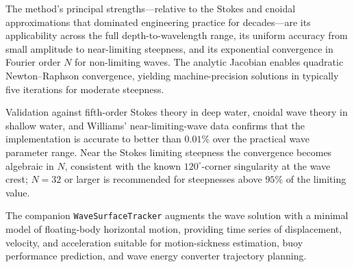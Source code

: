 \documentclass[journal,10pt,twocolumn]{IEEEtran}
\begin{document}
The method's principal strengths---relative to the Stokes and cnoidal
approximations that dominated engineering practice for decades---are
its applicability across the full depth-to-wavelength range, its
uniform accuracy from small amplitude to near-limiting steepness, and
its exponential convergence in Fourier order $N$ for non-limiting
waves.
The analytic Jacobian enables quadratic Newton--Raphson convergence,
yielding machine-precision solutions in typically five iterations for
moderate steepness.

Validation against fifth-order Stokes theory in deep water, cnoidal
wave theory in shallow water, and Williams' near-limiting-wave data
confirms that the implementation is accurate to better than $0.01\%$
over the practical wave parameter range.
Near the Stokes limiting steepness the convergence becomes algebraic
in $N$, consistent with the known $120^\circ$-corner singularity at
the wave crest; $N=32$ or larger is recommended for steepnesses above
$95\%$ of the limiting value.

The companion \texttt{WaveSurfaceTracker} augments the wave solution
with a minimal model of floating-body horizontal motion, providing
time series of displacement, velocity, and acceleration suitable for
motion-sickness estimation, buoy performance prediction, and wave
energy converter trajectory planning.
\end{document}
